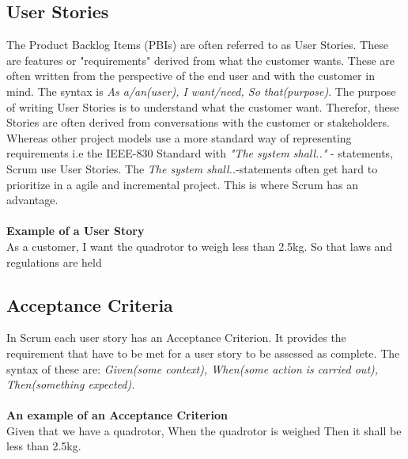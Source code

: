 

\subsection{User Stories}
The Product Backlog Items (PBIs) are often referred to as User Stories. These are features or "requirements" derived from what the customer wants. These are often written from the perspective of the end user and with the customer in mind. The syntax is \textit{As a/an(user), I want/need, So that(purpose)}. The purpose of writing User Stories is to understand what the customer want. Therefor, these Stories are often derived from conversations with the customer or stakeholders. Whereas other project models use a more standard way of representing requirements i.e the IEEE-830 Standard with \textit{"The system shall.."} - statements, Scrum use User Stories. The \textit{The system shall..}-statements often get hard to prioritize in a agile and incremental project. This is where Scrum has an advantage.
\\ \\
\textbf{Example of a User Story} \\
As a customer, I want the quadrotor to weigh less than 2.5kg. So that laws and regulations are held 

\subsection{Acceptance Criteria}
In Scrum each user story has an Acceptance Criterion. It provides the requirement that have to be met for a user story to be assessed as complete.  
The syntax of these are: \textit{Given(some context), When(some action is carried out), Then(something expected).} \\
\\ 
\textbf{An example of an Acceptance Criterion} \\
Given that we have a quadrotor, When the quadrotor is weighed Then it shall be less than 2.5kg.



